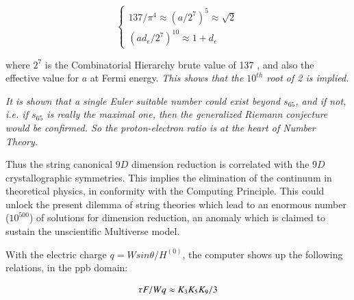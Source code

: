 \documentclass[a4paper,9pt]{article}
\newcounter{row}
\begin{document}
\begin{equation}
 \left\{
    \begin{array}{ll}
        137 / \pi^4 \approx (a/2^7)^5  \approx \sqrt 2 \\
       (ad_e/2^7)^{10} \approx 1 + d_e
    \end{array}
\right.
\end{equation}

where $2^7$ is the Combinatorial Hierarchy brute value of 137 \cite {Bastin}, and also the effective value for $a$ at Fermi energy. \textit{This shows that the $10^{th}$ root of 2 is implied.}

\textit{It is shown \cite{Weinberger} that a single Euler suitable number could exist beyond $s_{65}$, and if not, i.e. if $s_{65}$ is really the maximal one, then the generalized Riemann conjecture would be confirmed. So the proton-electron ratio is at the heart of Number Theory.}

Thus the string canonical $9D$ dimension reduction is correlated with the $9D$ crystallographic symmetries. This implies the elimination of the continuum in theoretical physics, in conformity with the Computing Principle. This could unlock the present dilemma of string theories which lead to an enormous number ($10^{500}$) of solutions for dimension reduction, an anomaly which is claimed to sustain the unscientific Multiverse model.



 
 
 

With the electric charge $q = Wsin\theta/H^{(0)}$, the computer shows up the following relations, in the ppb domain: 

\begin{equation}
 \tau F/ W q \approx K_3 K_5 K_9/3 \\
\end{equation}
\end{document}
